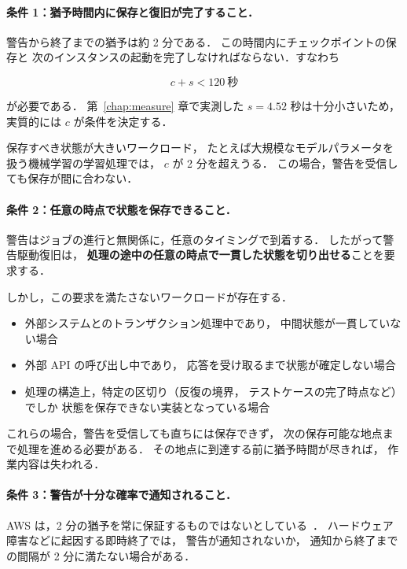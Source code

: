 \documentclass[11pt,a4paper]{ltjsreport}
\begin{document}
\paragraph{条件 1：猶予時間内に保存と復旧が完了すること．}
警告から終了までの猶予は約 2 分である．
この時間内にチェックポイントの保存と
次のインスタンスの起動を完了しなければならない．すなわち

\begin{equation}
c + s < 120\ \text{秒}
\label{eq:warning_cond}
\end{equation}

が必要である．
第~\ref{chap:measure} 章で実測した $s = 4.52$ 秒は十分小さいため，
実質的には $c$ が条件を決定する．

保存すべき状態が大きいワークロード，
たとえば大規模なモデルパラメータを扱う機械学習の学習処理では，
$c$ が 2 分を超えうる．
この場合，警告を受信しても保存が間に合わない．

\paragraph{条件 2：任意の時点で状態を保存できること．}
警告はジョブの進行と無関係に，任意のタイミングで到着する．
したがって警告駆動復旧は，
\textbf{処理の途中の任意の時点で一貫した状態を切り出せる}ことを要求する．

しかし，この要求を満たさないワークロードが存在する．

\begin{itemize}
  \item 外部システムとのトランザクション処理中であり，
        中間状態が一貫していない場合
  \item 外部 API の呼び出し中であり，
        応答を受け取るまで状態が確定しない場合
  \item 処理の構造上，特定の区切り（反復の境界，
        テストケースの完了時点など）でしか
        状態を保存できない実装となっている場合
\end{itemize}

これらの場合，警告を受信しても直ちには保存できず，
次の保存可能な地点まで処理を進める必要がある．
その地点に到達する前に猶予時間が尽きれば，
作業内容は失われる．

\paragraph{条件 3：警告が十分な確率で通知されること．}
AWS は，2 分の猶予を常に保証するものではないとしている~\cite{AWSSpot}．
ハードウェア障害などに起因する即時終了では，
警告が通知されないか，
通知から終了までの間隔が 2 分に満たない場合がある．
\end{document}
